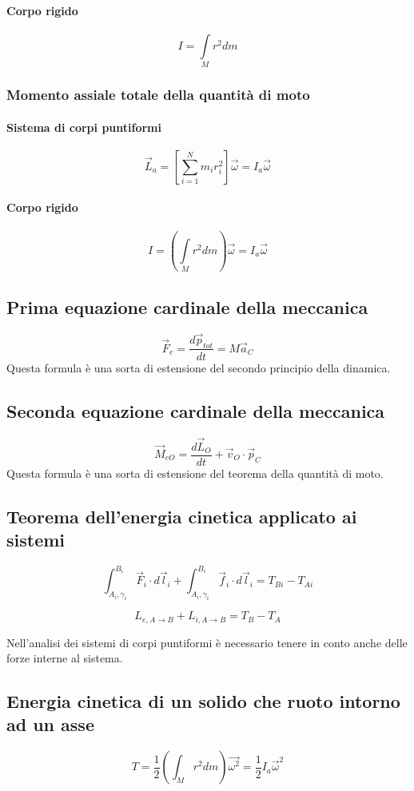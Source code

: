 \documentclass[12pt,a4paper]{report}
\begin{document}
			\paragraph{Corpo rigido}
			\[I=\int\limits_{M} r^{2}dm\]
		\subsubsection{Momento assiale totale della quantità di moto}
			\paragraph{Sistema di corpi puntiformi}
			\[\vec{L}_{a}=[\sum\limits_{i=1}^N m_{i}r_{i}^{2}]\vec{\omega}=I_{a}\vec{\omega}\]
			\paragraph{Corpo rigido}
			\[I=(\int\limits_{M} r^{2}dm)\vec{\omega}=I_{a}\vec{\omega}\]
	\subsection{Prima equazione cardinale della meccanica}
			\[\vec{F}_{e}=\frac{d\vec{p}_{tot}}{dt}=M\vec{a}_{C}\]
Questa formula è una sorta di estensione del secondo principio della dinamica.
	\subsection{Seconda equazione cardinale della meccanica}
			\[ \vec{M}_{eO} = \frac{d \vec{L}_{O}}{dt} + \vec{v}_{O} \cdot \vec{p}_{C}\]
Questa formula è una sorta di estensione del teorema della quantità di moto.
	\subsection{Teorema dell'energia cinetica applicato ai sistemi}
				
		\[ \int_{A_{i},\gamma_{i}}^{B_{i}} \vec{F}_{i} \cdot d \vec{l}_{i} + \int_{A_{i},\gamma_{i}}^{B_{i}} \vec{f}_{i} \cdot d\vec{l}_{i} = T_{Bi}-T_{Ai} \]
		
		\[L_{e,A \rightarrow B} + L_{i,A \rightarrow B} = T_{B}- T_{A}\]		
				
Nell'analisi dei sistemi di corpi puntiformi è necessario tenere in conto anche delle forze interne al sistema.
	\subsection{Energia cinetica di un solido che ruoto intorno ad un asse}
	\[T = \frac{1}{2}(\int_{M} r^{2}dm)\vec{\omega^{2}} = \frac{1}{2} I_{a} \vec{\omega}^{2}\]
\end{document}
